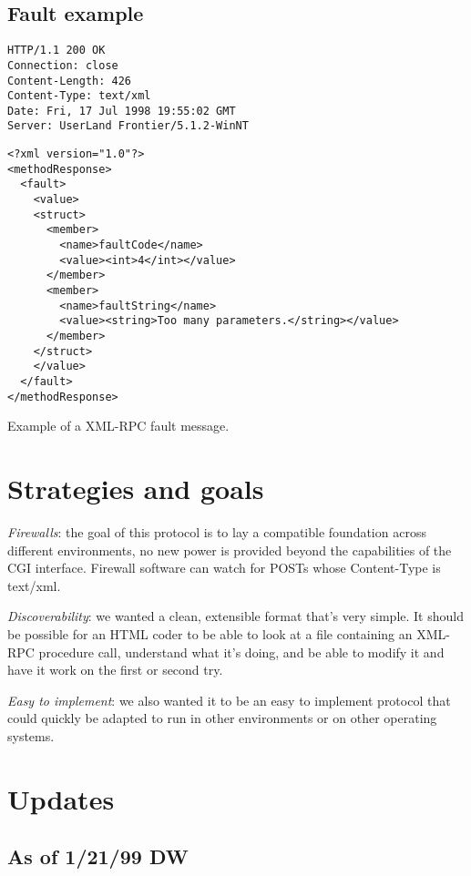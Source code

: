 \subsection{Fault example}
\begin{code}
\begin{verbatim}
HTTP/1.1 200 OK
Connection: close
Content-Length: 426
Content-Type: text/xml
Date: Fri, 17 Jul 1998 19:55:02 GMT
Server: UserLand Frontier/5.1.2-WinNT
\end{verbatim}

\begin{lstlisting}
<?xml version="1.0"?>
<methodResponse>
  <fault>
    <value>
    <struct>
      <member>
        <name>faultCode</name>
        <value><int>4</int></value>
      </member>
      <member>
        <name>faultString</name>
        <value><string>Too many parameters.</string></value>
      </member>
    </struct>
    </value>
  </fault>
</methodResponse>
\end{lstlisting}
\caption{Example of a XML-RPC fault message.}
\label{code:xmlrpc:fault}
\end{code}


%
%

\section{Strategies and goals}

\emph{Firewalls}: the goal of this protocol is to lay a compatible foundation across different environments, no new power is provided beyond the capabilities of the CGI interface. Firewall software can watch for POSTs whose Content-Type is text/xml.

\emph{Discoverability}: we wanted a clean, extensible format that's very simple. It should be possible for an HTML coder to be able to look at a file containing an XML-RPC procedure call, understand what it's doing, and be able to modify it and have it work on the first or second try.

\emph{Easy to implement}: we also wanted it to be an easy to implement protocol that could quickly be adapted to run in other environments or on other operating systems.


%
%

\section{Updates}

\subsection{As of 1/21/99 DW}

